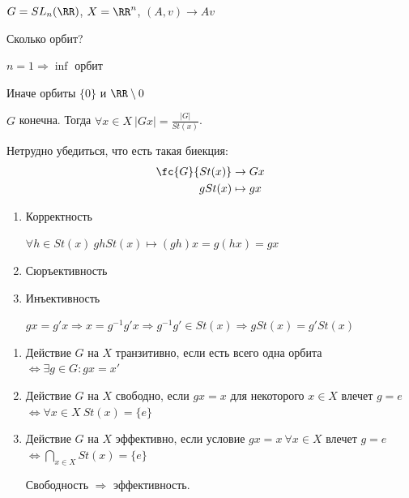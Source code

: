 \begin{example}{}{}
    \( G = SL_n (\RR) \), \( X = \RR^n \), \( (A, v) \to Av \)

    Сколько орбит?

    \( n = 1 \Rightarrow \inf \) орбит

    Иначе орбиты \( \{ 0 \} \) и \( \RR \setminus 0 \)
\end{example}

\begin{lemma}{}{}
    \( G \) конечна.
    Тогда \( \forall x \in X \ |Gx| = \frac{|G|}{St(x)} \).
\end{lemma}

Нетрудно убедиться, что есть такая биекция:
\[
    \begin{aligned}
        \fc{G}{St(x)} &\to Gx
        \\
        g St(x) &\mapsto gx
    \end{aligned}
\]

\begin{enumerate}
    \item
        Корректность

        \( \forall h \in St(x) \ ghSt(x) \mapsto (gh) x = g (hx) = gx \)
    \item
        Сюръективность
    \item
        Инъективность

        \(
            g x = g' x
            \Rightarrow
            x = g^{-1} g' x
            \Rightarrow
            g^{-1} g' \in St(x)
            \Rightarrow
            g St(x) = g' St(x)
        \)
\end{enumerate}

\begin{defn}{}{}
    \begin{enumerate}
        \item
            Действие \( G \) на \( X \) транзитивно,
            если есть всего одна орбита
            \( \Leftrightarrow \exists g \in G : gx = x' \)
        \item
            Действие \( G \) на \( X \) свободно,
            если \( gx = x \) для некоторого \( x \in X \)
            влечет \( g = e \) \( \Leftrightarrow \forall x \in X \ St(x) = \{ e \} \)
        \item
            Действие \( G \) на \( X \) эффективно,
            если условие \( gx = x \ \forall x \in X \) влечет \( g = e \)
            \( \Leftrightarrow \bigcap\limits_{x \in X} St(x) = \{ e \} \)

            Свободность \( \Rightarrow \) эффективность.
    \end{enumerate}
\end{defn}


